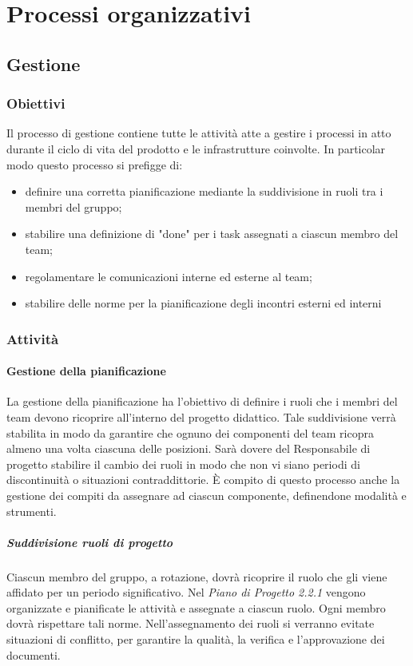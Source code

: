 \section{Processi organizzativi}

	\subsection{Gestione}
	\subsubsection{Obiettivi}
	Il processo di gestione contiene tutte le attività atte a gestire i processi in atto durante il ciclo di vita del prodotto e le infrastrutture coinvolte.
	In particolar modo questo processo si prefigge di:
	\begin{itemize}
		\item definire una corretta pianificazione mediante la suddivisione in ruoli tra i membri del gruppo;
		\item stabilire una definizione di "done" per i task assegnati a ciascun membro del team;
		\item regolamentare le comunicazioni interne ed esterne al team;
		\item stabilire delle norme per la pianificazione degli incontri esterni ed interni
	\end{itemize}
	
	\subsubsection{Attività}
	\paragraph{Gestione della pianificazione}
	La gestione della pianificazione ha l'obiettivo di definire i ruoli che i membri del team devono ricoprire all'interno del progetto didattico. Tale suddivisione verrà stabilita in modo da garantire che ognuno dei componenti del team ricopra almeno una volta ciascuna delle posizioni. Sarà dovere del Responsabile di progetto stabilire il cambio dei ruoli in modo che non vi siano periodi di discontinuità o situazioni contraddittorie. È compito di questo processo anche la gestione dei compiti da assegnare ad ciascun componente, definendone modalità e strumenti.
	
   		\subparagraph*{Suddivisione ruoli di progetto}
   			Ciascun membro del gruppo, a rotazione, dovrà ricoprire il ruolo che gli viene affidato per un periodo significativo. Nel \textit{Piano di Progetto 2.2.1\docs} vengono organizzate e pianificate le attività e assegnate a ciascun ruolo. Ogni membro dovrà rispettare tali norme.
   			Nell'assegnamento dei ruoli si verranno evitate situazioni di conflitto, per garantire la qualità, la verifica e l'approvazione dei documenti.

